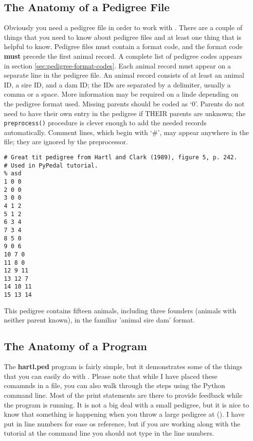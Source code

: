 \subsection{The Anatomy of a Pedigree File}
Obviously you need a pedigree file in order to work with \PyPedal{}.  There are a couple of things that you need to know about pedigree files and at least one thing that is helpful to know.  Pedigree files must contain a format code, and the format code \textbf{must} precede the first animal record.  A complete list of pedigree codes appears in section \ref{sec:pedigree-format-codes}.  Each animal record must appear on a separate line in the pedigree file.  An animal record consists of at least an animal ID, a sire ID, and a dam ID; the IDs are separated by a delimiter, usually a comma or a space.  More information may be required on a linde depending on the pedigree format used.  Missing parents should be coded as `0'.  Parents do not need to have their own entry in the pedigree if THEIR parents are unknown; the \texttt{preprocess()} procedure is clever enough to add the needed records automatically.  Comment lines, which begin with `\#', may appear anywhere in the file; they are ignored by the preprocessor.
\begin{verbatim}
# Great tit pedigree from Hartl and Clark (1989), figure 5, p. 242.
# Used in PyPedal tutorial.
% asd
1 0 0
2 0 0
3 0 0
4 1 2
5 1 2
6 3 4
7 3 4
8 5 0
9 0 6
10 7 0
11 8 0
12 9 11
13 12 7
14 10 11
15 13 14
\end{verbatim}
This pedigree contains fifteen animals, including three founders (animals with neither parent known), in the familiar 'animal sire dam' format.

\subsection{The Anatomy of a Program}
The \textbf{hartl.ped} program is fairly simple, but it demonstrates some of the things that you can easily do with \PyPedal{}.  Please note that while I have placed these comamnds in a file, you can also walk through the steps using the Python command line.  Most of the print statements are there to provide feedback while the program is running.  It is not a big deal with a small pedigree, but it is nice to know that something is happening when you throw a large pedigree at \PyPedal().  I have put in line numbers for ease os reference, but if you are working along with the tutorial at the command line you should not type in the line numbers.

